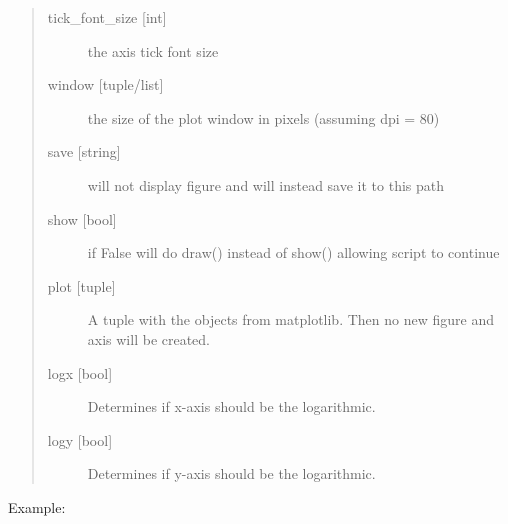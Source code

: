 \documentclass[letterpaper,10pt,english]{sphinxmanual}
\begin{document}
\begin{fulllineitems}
\begin{description}
\begin{quote}
\begin{description}
\item[{tick\_font\_size {[}int{]}}] \leavevmode
the axis tick font size

\item[{window {[}tuple/list{]}}] \leavevmode
the size of the plot window in pixels (assuming dpi = 80)

\item[{save {[}string{]}}] \leavevmode
will not display figure and will instead save it to this path

\item[{show {[}bool{]}}] \leavevmode
if False will do draw() instead of show() allowing script to continue

\item[{plot {[}tuple{]}}] \leavevmode
A tuple with the  objects from matplotlib. Then no new figure and axis will be created.

\item[{logx {[}bool{]}}] \leavevmode
Determines if x-axis should be the logarithmic.

\item[{logy {[}bool{]}}] \leavevmode
Determines if y-axis should be the logarithmic.

\end{description}\end{quote}

\end{description}

Example:

%
\begin{sphinxVerbatim}[commandchars=\\\{\}]
   
   

  

     
\end{sphinxVerbatim}

\end{fulllineitems}

\end{document}
